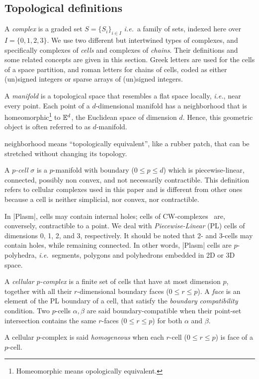 \subsection*{Topological definitions}\label{sect:3-2-1}

A \emph{complex} is a graded set $S = \{ S_i \}_{i\in I}$ \emph{i.e.}~a family of sets, indexed here over $I = \{0,1,2,3\}$.
We use two different but intertwined types of {complexes}, and specifically complexes of \emph{cells} and complexes of \emph{chains}. 
Their definitions and some related concepts are given in this section. Greek letters are used for the {cells} of a space partition, and roman letters for {chains} of cells, coded as either (un)signed integers or sparse arrays of (un)signed integers.  


\begin{definition}[$d$-Manifold]
A \emph{manifold} is a topological space that resembles a flat space locally, \emph{i.e.}, near every point. 
Each point of a $d$-dimensional manifold has a neighborhood that is homeomorphic\footnote{Homeomorphic means opologically equivalent.} to $\mathbb{E}^d$, the Euclidean space of dimension $d$. Hence, this geometric object is often referred to as $d$-manifold. 
\end{definition}
 neighborhood means “topologically equivalent”, like a rubber patch, that can be stretched without changing its topology.

\begin{definition}[Cell]
A \emph{$p$-cell} $\sigma$ is a $p$-manifold with boundary ($0\leq p\leq d$) which is 
piecewise-linear, connected, possibly non convex, and not necessarily contractible. This definition refers to cellular complexes used in this paper and is different from other ones because a cell is neither simplicial, nor convex, nor contractible.
\end{definition}
In |Plasm|, cells may contain internal holes; cells of CW-complexes~\cite{hatcher:2002} are, conversely,  contractible to a point.  
We deal with \emph{Piecewise-Linear} (PL) cells of dimensions 0, 1, 2, and 3, respectively. It should be noted that 2- and 3-cells may contain holes, while remaining connected.  In other words, |Plasm| cells are $p$-polyhedra, \emph{i.e.}~segments, polygons and polyhedrons embedded in 2D or 3D space. 

\begin{definition}
A \emph{cellular $p$-complex} is a finite set of cells that have at most dimension $p$, together with all their $r$-dimensional boundary faces ($0\leq r\leq p$). A \emph{face} is an element of the PL boundary of a cell, that satisfy the \emph{boundary compatibility} condition. Two $p$-cells $\alpha, \beta$ are said boundary-compatible when their point-set intersection contains the same $r$-faces ($0\leq r\leq p$) for both $\alpha$ and $\beta$. 
\end{definition}
A cellular $p$-complex is said {\emph{homogeneous} }when each $r$-cell ($0\leq r\leq p$) is face of a $p$-cell. 

